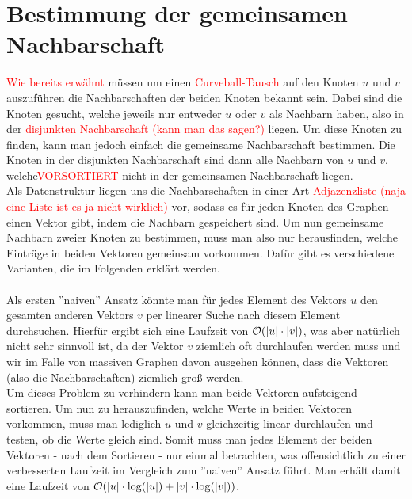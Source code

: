  

\section{Bestimmung der gemeinsamen Nachbarschaft}

\textcolor{red}{Wie bereits erwähnt} müssen um einen \textcolor{red}{Curveball-Tausch} auf den Knoten $u$ und $v$
auszuführen die Nachbarschaften der beiden Knoten bekannt sein. Dabei sind die Knoten gesucht, 
welche jeweils nur entweder $u$ oder $v$ als Nachbarn haben, also in der \textcolor{red}{disjunkten Nachbarschaft (kann man das sagen?)} liegen.
Um diese Knoten zu finden, kann man jedoch einfach die gemeinsame Nachbarschaft bestimmen. Die Knoten
in der disjunkten Nachbarschaft sind dann alle Nachbarn von $u$ und $v$, welche\textcolor{red}{VORSORTIERT}
 nicht in der gemeinsamen
Nachbarschaft liegen. 
\\
Als Datenstruktur liegen uns die Nachbarschaften in einer Art \textcolor{red}{Adjazenzliste (naja eine Liste ist es ja nicht wirklich)}
vor, sodass es für jeden Knoten des Graphen einen Vektor gibt, indem die Nachbarn gespeichert sind.
Um nun gemeinsame Nachbarn
zweier Knoten zu bestimmen, muss man also nur herausfinden, welche Einträge in beiden Vektoren gemeinsam
vorkommen. Dafür gibt es verschiedene Varianten, die 
im Folgenden erklärt werden.
\\
\\
Als ersten ''naiven'' Ansatz könnte man für jedes Element des Vektors $u$ den gesamten anderen 
Vektors $v$ per linearer Suche nach diesem Element durchsuchen. Hierfür ergibt sich eine Laufzeit von
$\mathcal{O}(|u|\cdot|v|)$, was aber natürlich nicht sehr sinnvoll ist, da der Vektor $v$ ziemlich oft 
durchlaufen werden muss und wir 
im Falle von massiven Graphen davon ausgehen können, dass die Vektoren (also die Nachbarschaften)
ziemlich groß werden. 
\\
Um dieses Problem zu verhindern kann man beide Vektoren aufsteigend sortieren. Um nun zu herauszufinden,
welche Werte in beiden Vektoren vorkommen, muss man lediglich $u$ und $v$ gleichzeitig linear durchlaufen
und testen, ob die Werte gleich sind. Somit muss man jedes Element der beiden Vektoren - nach dem Sortieren - 
nur einmal betrachten, was offensichtlich zu einer verbesserten Laufzeit im Vergleich zum ''naiven''
Ansatz führt. Man erhält damit eine Laufzeit von $\mathcal{O}(|u|\cdot \log (|u|)  + |v|\cdot\log(|v|))$. 
